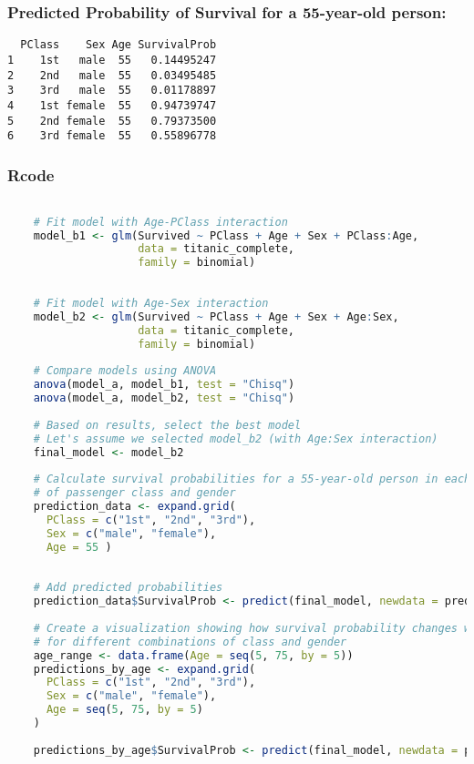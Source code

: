 \documentclass{article}
\begin{document}
\subsubsection{Predicted Probability of Survival for a 55-year-old person:}
\begin{verbatim}
  PClass    Sex Age SurvivalProb
1    1st   male  55   0.14495247
2    2nd   male  55   0.03495485
3    3rd   male  55   0.01178897
4    1st female  55   0.94739747
5    2nd female  55   0.79373500
6    3rd female  55   0.55896778
\end{verbatim}

\subsubsection{Rcode}
\begin{lstlisting}[language=R, breaklines=true, keywordstyle=\color{magenta},
    numberstyle=\tiny\color{codegray},
    stringstyle=\color{codepurple},
    basicstyle=\ttfamily\footnotesize,
    aboveskip=0pt, belowskip=0pt]

    # Fit model with Age-PClass interaction
    model_b1 <- glm(Survived ~ PClass + Age + Sex + PClass:Age, 
                    data = titanic_complete, 
                    family = binomial)
    
    
    # Fit model with Age-Sex interaction
    model_b2 <- glm(Survived ~ PClass + Age + Sex + Age:Sex, 
                    data = titanic_complete, 
                    family = binomial)
    
    # Compare models using ANOVA
    anova(model_a, model_b1, test = "Chisq")
    anova(model_a, model_b2, test = "Chisq")
    
    # Based on results, select the best model
    # Let's assume we selected model_b2 (with Age:Sex interaction)
    final_model <- model_b2
    
    # Calculate survival probabilities for a 55-year-old person in each combination
    # of passenger class and gender
    prediction_data <- expand.grid(
      PClass = c("1st", "2nd", "3rd"),
      Sex = c("male", "female"),
      Age = 55 )
    
    
    # Add predicted probabilities
    prediction_data$SurvivalProb <- predict(final_model, newdata = prediction_data, type = "response")
    
    # Create a visualization showing how survival probability changes with age
    # for different combinations of class and gender
    age_range <- data.frame(Age = seq(5, 75, by = 5))
    predictions_by_age <- expand.grid(
      PClass = c("1st", "2nd", "3rd"),
      Sex = c("male", "female"),
      Age = seq(5, 75, by = 5)
    )
    
    predictions_by_age$SurvivalProb <- predict(final_model, newdata = predictions_by_age, type = "response")
\end{lstlisting}
\end{document}

